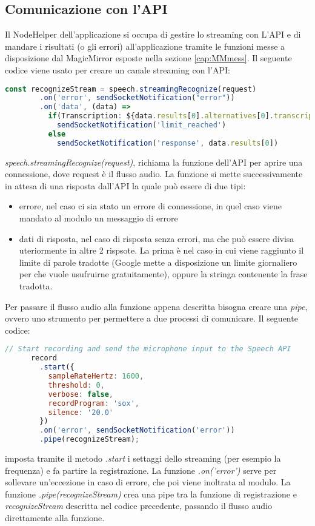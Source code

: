 \subsection{Comunicazione con l'API}\label{cap:api}
Il NodeHelper dell'applicazione si occupa di gestire lo streaming con L'API e
di mandare i risultati (o gli errori) all'applicazione tramite le funzioni messe
a disposizione dal MagicMirror esposte nella sezione \ref{cap:MMmess}.
Il seguente codice viene usato per creare un canale streaming con l'API:
\begin{lstlisting}[language=Javascript, caption={Codice per la comunicazione con l'API}, captionpos=b]
      const recognizeStream = speech.streamingRecognize(request)
        .on('error', sendSocketNotification("error"))
        .on('data', (data) =>
          if(Transcription: ${data.results[0].alternatives[0].transcript}\n)
            sendSocketNotification('limit_reached')
          else
            sendSocketNotification('response', data.results[0])
\end{lstlisting}
\emph{speech.streamingRecognize(request)}, richiama la funzione dell'API per aprire una connessione, dove request \`e
il flusso audio.
La funzione si mette successivamente in attesa di una risposta dall'API la quale pu\`o essere di due tipi:
\begin{itemize}
\item errore, nel caso ci sia stato un errore di connessione, in quel caso viene mandato al modulo un messaggio di errore
\item dati di risposta, nel caso di risposta senza errori, ma che pu\`o essere divisa uteriormente in altre 2 rispsote. La prima \`e nel caso in cui
viene raggiunto il limite di parole tradotte (Google mette a disposizione un limite giornaliero per che vuole usufruirne gratuitamente), oppure
la stringa contenente la frase tradotta.\\[1\baselineskip]
\end{itemize}
Per passare il flusso audio alla funzione appena descritta bisogna creare una \emph{pipe}, ovvero uno strumento
per permettere a due processi di comunicare.
Il seguente codice:
\begin{lstlisting}[language=Javascript]
      // Start recording and send the microphone input to the Speech API
      record
        .start({
          sampleRateHertz: 1600,
          threshold: 0,
          verbose: false,
          recordProgram: 'sox',
          silence: '20.0'
        })
        .on('error', sendSocketNotification('error'))
        .pipe(recognizeStream);
\end{lstlisting}
imposta tramite il metodo \emph{.start} i settaggi dello streaming (per esempio la frequenza) e fa partire la registrazione.
La funzione \emph{.on('error')} serve per sollevare un'eccezione in caso di errore, che poi viene inoltrata al modulo.
La funzione \emph{.pipe(recognizeStream)} crea una pipe tra la funzione di registrazione e \emph{recognizeStream} descritta nel codice precedente,
passando il flusso audio direttamente alla funzione.

